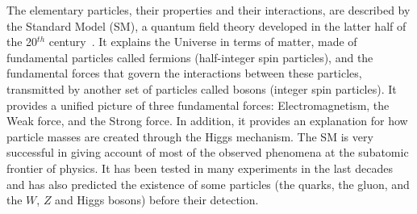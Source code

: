 
The elementary particles, their properties and their interactions, are described by the Standard Model (SM), a quantum field theory developed in the latter half of the 20$^{th}$ century~\cite{oerter2006theory}. It explains the Universe in terms of matter, made of fundamental particles called fermions (half-integer spin particles), and the fundamental forces that govern the interactions between these particles, transmitted by another set of particles called bosons (integer spin particles). It provides a unified picture of three fundamental forces: Electromagnetism, the Weak force, and the Strong force. In addition, it provides an explanation for how particle masses are created through the Higgs mechanism. The SM is very successful in giving account of most of the observed phenomena at the subatomic frontier of physics. It has been tested in many experiments in the last decades and has also predicted the existence of some particles (the quarks, the gluon, and the $W$, $Z$ and Higgs bosons) before their detection.

